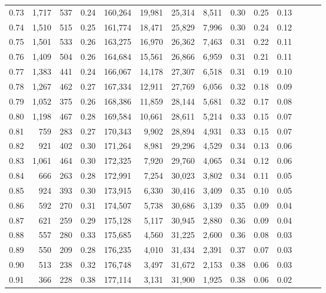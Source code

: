 \begin{tabular}{rrrrrrrrrrrrrr}
0.73 &  1,717 &  537 &  0.24 &  160,264 &   19,981 &  25,314 &   8,511 &  0.30 &  0.25 &      0.13 \\
0.74 &  1,510 &  515 &  0.25 &  161,774 &   18,471 &  25,829 &   7,996 &  0.30 &  0.24 &      0.12 \\
0.75 &  1,501 &  533 &  0.26 &  163,275 &   16,970 &  26,362 &   7,463 &  0.31 &  0.22 &      0.11 \\
0.76 &  1,409 &  504 &  0.26 &  164,684 &   15,561 &  26,866 &   6,959 &  0.31 &  0.21 &      0.11 \\
0.77 &  1,383 &  441 &  0.24 &  166,067 &   14,178 &  27,307 &   6,518 &  0.31 &  0.19 &      0.10 \\
0.78 &  1,267 &  462 &  0.27 &  167,334 &   12,911 &  27,769 &   6,056 &  0.32 &  0.18 &      0.09 \\
0.79 &  1,052 &  375 &  0.26 &  168,386 &   11,859 &  28,144 &   5,681 &  0.32 &  0.17 &      0.08 \\
0.80 &  1,198 &  467 &  0.28 &  169,584 &   10,661 &  28,611 &   5,214 &  0.33 &  0.15 &      0.07 \\
0.81 &    759 &  283 &  0.27 &  170,343 &    9,902 &  28,894 &   4,931 &  0.33 &  0.15 &      0.07 \\
0.82 &    921 &  402 &  0.30 &  171,264 &    8,981 &  29,296 &   4,529 &  0.34 &  0.13 &      0.06 \\
0.83 &  1,061 &  464 &  0.30 &  172,325 &    7,920 &  29,760 &   4,065 &  0.34 &  0.12 &      0.06 \\
0.84 &    666 &  263 &  0.28 &  172,991 &    7,254 &  30,023 &   3,802 &  0.34 &  0.11 &      0.05 \\
0.85 &    924 &  393 &  0.30 &  173,915 &    6,330 &  30,416 &   3,409 &  0.35 &  0.10 &      0.05 \\
0.86 &    592 &  270 &  0.31 &  174,507 &    5,738 &  30,686 &   3,139 &  0.35 &  0.09 &      0.04 \\
0.87 &    621 &  259 &  0.29 &  175,128 &    5,117 &  30,945 &   2,880 &  0.36 &  0.09 &      0.04 \\
0.88 &    557 &  280 &  0.33 &  175,685 &    4,560 &  31,225 &   2,600 &  0.36 &  0.08 &      0.03 \\
0.89 &    550 &  209 &  0.28 &  176,235 &    4,010 &  31,434 &   2,391 &  0.37 &  0.07 &      0.03 \\
0.90 &    513 &  238 &  0.32 &  176,748 &    3,497 &  31,672 &   2,153 &  0.38 &  0.06 &      0.03 \\
0.91 &    366 &  228 &  0.38 &  177,114 &    3,131 &  31,900 &   1,925 &  0.38 &  0.06 &      0.02 \\

\end{tabular}
